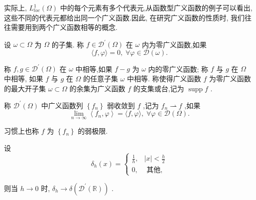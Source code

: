 \documentclass[lang=cn,newtx,10pt,scheme=chinese,thmcnt=chapter]{elegantbook}
\begin{document}
实际上, \({L}_{loc}^{1}\left( \Omega \right)\) 中的每个元素有多个代表元,从函数型广义函数的例子可以看出, 这些不同的代表元都给出同一个广义函数.因此, 在研究广义函数的性质时, 我们往往需要用到两个广义函数相等的概念.
\begin{definition}
  设 \(\omega  \subset  \Omega\) 为 \(\Omega\) 的子集. 称 \(f \in  {\mathcal{D}}^{\prime }\left( \Omega \right)\) 在 \(\omega\) 内为零广义函数,如果
\begin{equation*}
\langle f,\varphi \rangle  = 0,\;\forall \varphi  \in  \mathcal{D}\left( \omega \right) .
\end{equation*}

称 \(f,g \in  {\mathcal{D}}^{\prime }\left( \Omega \right)\) 在 \(\omega\) 中相等,如果 \(f - g\) 为 \(\omega\) 内的零广义函数; 称 \(f\) 与 \(g\) 在 \(\Omega\) 中相等, 如果 \(f\) 与 \(g\) 在 \(\Omega\) 的任意子集 \(\omega\) 中相等. 称使得广义函数 \(f\) 为零广义函数的最大开子集 \(\omega  \subset  \Omega\) 的余集为广义函数 \(f\) 的支集或台,记为 \(\operatorname{supp}f\) .

\end{definition}
\begin{definition}
  称 \({\mathcal{D}}^{\prime }\left( \Omega \right)\) 中广义函数列 \(\left\{  {f}_{n}\right\}\) 弱收敛到 \(f\) ,记为 \({f}_{n} \rightharpoonup  f\) ,如果
\begin{equation*}
\mathop{\lim }\limits_{{n \rightarrow  \infty }}\left\langle  {{f}_{n},\varphi }\right\rangle   = \langle f,\varphi \rangle ,\;\forall \varphi  \in  \mathcal{D}\left( \Omega \right) .
\end{equation*}

习惯上也称 \(f\) 为 \(\left\{  {f}_{n}\right\}\) 的弱极限.
\end{definition}
\begin{example}
  设
\begin{equation*}
{\delta }_{h}\left( x\right)  = \left\{  \begin{array}{ll} \frac{1}{h}, & \left| x\right|  < \frac{h}{2} \\  0, & \text{ 其他, } \end{array}\right.
\end{equation*}

则当 \(h \rightarrow  0\) 时, \({\delta }_{h} \rightarrow  \delta \left( {{\mathcal{D}}^{\prime }\left( \mathbb{R}\right) }\right)\) .

\end{example}
\end{document}
